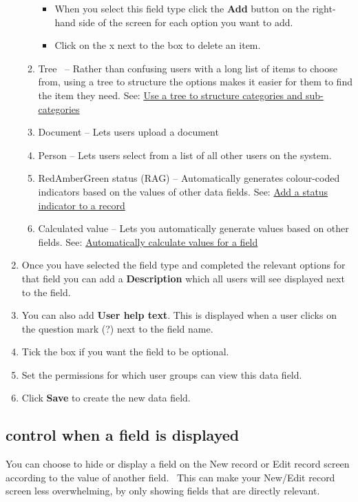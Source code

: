 \documentclass{ctrlo-int-toc}
\begin{document}
\begin{admin}
\begin{enumerate}
\begin{enumerate}
\begin{itemize}
    \item When you select this field type click the \textbf{Add} button on the right-hand side of the screen for each option you want to add.
\item Click on the x next to the box to delete an item. 
\end{itemize}
\item Tree \ {}-- Rather than confusing users with a long list of items to choose from, using a tree to structure the options makes it easier for them to find the item they need. See: \hyperref[subsec:fieldtree]{Use a tree to structure categories and sub-categories}
\item Document {}-- Lets users upload a document
\item Person {}-- Lets users select from a list of all other users on the system.
\item RedAmberGreen status (RAG) \--- Automatically generates colour-coded indicators based on the values of other data fields. See: \hyperref[subsec:fieldrag]{Add a status indicator to a record}
\item Calculated value {}-- Lets you automatically generate values based on other fields. See: \hyperref[subsec:fieldcalc]{Automatically calculate values for a field}
\end{enumerate}
\item Once you have selected the field type and completed the relevant options for that field you can add a \textbf{Description} which all users will see displayed next to the field. 
\item You can also add \textbf{User help text}. This is displayed when a user clicks on the question mark (?) next to the field name. 
\item Tick the box if you want the field to be optional.
\item Set the permissions for which user groups can view this data field.
\item Click \textbf{Save} to create the new data field. 
\end{enumerate}

\subsection[control when a field is displayed]{control when a field is displayed}
You can choose to hide or display a field on the New record or Edit record screen according to the value of another field. \ This can make your New/Edit record screen less overwhelming, by only showing fields that are directly relevant. 


\end{admin}
\end{document}
